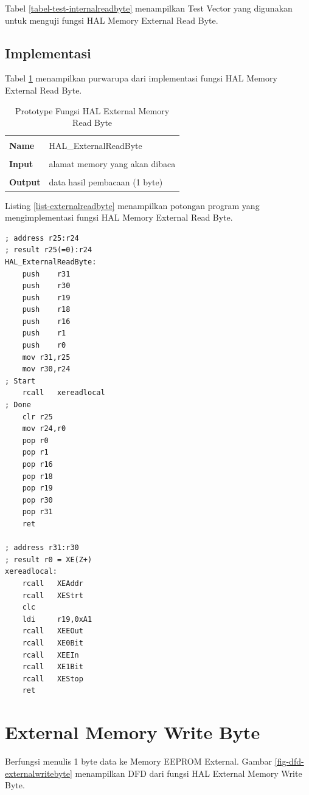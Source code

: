 Tabel \ref{tabel-test-internalreadbyte} menampilkan Test Vector yang digunakan untuk menguji fungsi HAL Memory External Read Byte.

\subsection {Implementasi}

Tabel \ref{tabel-externalreadbyte} menampilkan purwarupa dari implementasi fungsi HAL Memory External Read Byte.

\begin{table}[!h]
  \centering
  \begin{tabular}{p{2cm} p{8cm}}
    \hline\\
    {\bf Name} & HAL\_ExternalReadByte\\
    \hline\\
    {\bf Input} & alamat memory yang akan dibaca
    \\
    \hline\\
    {\bf Output} & data hasil pembacaan (1 byte)
    \\
    \hline
  \end{tabular}
  \caption{Prototype Fungsi HAL External Memory Read Byte}
  \label{tabel-externalreadbyte}
\end{table}

Listing \ref{list-externalreadbyte} menampilkan potongan program yang mengimplementasi fungsi HAL Memory External Read Byte.

\begin{lstlisting}[language={[x86masm]Assembler}, caption={Listing Program Fungsi HAL Memory External Read Byte}, label={list-externalreadbyte}]
; address r25:r24 
; result r25(=0):r24
HAL_ExternalReadByte:
	push	r31
	push	r30
	push	r19
	push	r18
	push	r16
	push	r1
	push	r0
	mov	r31,r25
	mov	r30,r24
; Start
	rcall	xereadlocal
; Done
	clr	r25
	mov	r24,r0
	pop	r0
	pop	r1
	pop	r16
	pop	r18
	pop	r19
	pop	r30
	pop	r31
	ret

; address r31:r30 
; result r0 = XE(Z+)
xereadlocal:
	rcall	XEAddr
	rcall	XEStrt
	clc
	ldi		r19,0xA1
	rcall	XEEOut
	rcall	XE0Bit
	rcall	XEEIn
	rcall	XE1Bit
	rcall	XEStop
	ret
\end{lstlisting}

\section{External Memory Write Byte}
\label{sec_externalmemorywritebyte}

Berfungsi menulis 1 byte data ke Memory EEPROM External. Gambar \ref{fig-dfd-externalwritebyte} menampilkan DFD dari fungsi HAL External Memory Write Byte. 

